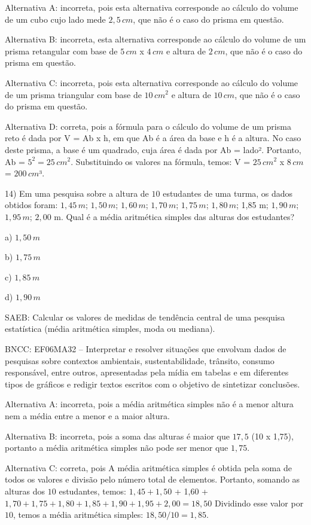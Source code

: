 Alternativa A: incorreta, pois esta alternativa corresponde ao cálculo
do volume de um cubo cujo lado mede $2,5\,cm$, que não é o caso do prisma
em questão.

Alternativa B: incorreta, esta alternativa corresponde ao cálculo do
volume de um prisma retangular com base de $5\,cm$ x $4\,cm$ e altura de $2\,cm$,
que não é o caso do prisma em questão.

Alternativa C: incorreta, pois esta alternativa corresponde ao cálculo
do volume de um prisma triangular com base de $10\,cm^2$ e altura de $10\,cm$,
que não é o caso do prisma em questão.

Alternativa D: correta, pois a fórmula para o cálculo do volume de um
prisma reto é dada por V = Ab x h, em que Ab é a área da base e h é a
altura. No caso deste prisma, a base é um quadrado, cuja área é dada por
Ab = lado². Portanto, Ab = $5^2 = 25\,cm^2$. Substituindo os valores na
fórmula, temos: V = $25\,cm^2$ x $8\,cm$ = $200\,cm$³.

14) Em uma pesquisa sobre a altura de $10$ estudantes de uma turma, os
dados obtidos foram: $1,45\,m$; $1,50\,m$; $1,60\,m$; $1,70\,m$; $1,75\,m$; $1,80\,m$;
1,85 m; $1,90\,m$; $1,95\,m$; $2,00$ m. Qual é a média aritmética simples das
alturas dos estudantes?

a) $1,50\,m$

b) $1,75\,m$

c) $1,85\,m$

d) $1,90\,m$

SAEB: Calcular os valores de medidas de tendência central de uma
pesquisa estatística (média aritmética simples, moda ou mediana).

BNCC: EF06MA32 -- Interpretar e resolver situações que envolvam dados de
pesquisas sobre contextos ambientais, sustentabilidade, trânsito,
consumo responsável, entre outros, apresentadas pela mídia em tabelas e
em diferentes tipos de gráficos e redigir textos escritos com o objetivo
de sintetizar conclusões.

Alternativa A: incorreta, pois a média aritmética simples não é a menor
altura nem a média entre a menor e a maior altura.

Alternativa B: incorreta, pois a soma das alturas é maior que $17,5$ (10 x
1,75), portanto a média aritmética simples não pode ser menor que $1,75$.

Alternativa C: correta, pois A média aritmética simples é obtida pela
soma de todos os valores e divisão pelo número total de elementos.
Portanto, somando as alturas dos $10$ estudantes, temos: $1,45 + 1,50$ +
1,60 + $1,70 + 1,75 + 1,80 + 1,85 + 1,90 + 1,95 + 2,00 = 18,50$ Dividindo
esse valor por $10$, temos a média aritmética simples: $18,50 / 10 = 1,85$.

